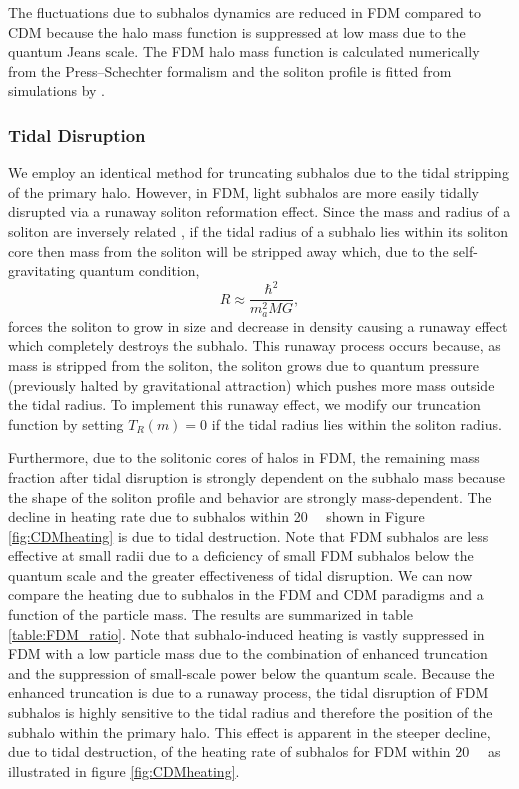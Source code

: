 \documentclass[usenatbib]{mnras}
\begin{document}
The fluctuations due to subhalos dynamics are reduced in FDM compared to CDM because the halo mass function is suppressed at low mass due to the quantum Jeans scale. The FDM halo mass function is calculated numerically from the Press--Schechter formalism \citep{substructure_FDM, marsh} and the soliton profile is fitted from simulations by \cite{schive_solitons}. 



\subsubsection{Tidal Disruption}

 
We employ an identical method for truncating subhalos due to the tidal stripping of the primary halo. However, in FDM, light subhalos are more easily tidally disrupted via a runaway soliton reformation effect. Since the mass and radius of a soliton are inversely related \citep{solitons}, if the tidal radius of a subhalo lies within its soliton core then mass from the soliton will be stripped away which, due to the self-gravitating quantum condition,
\begin{equation}
R \approx \frac{\hbar^2}{m_a^2 M G},
\end{equation} 
forces the soliton to grow in size and decrease in density causing a runaway effect which completely destroys the subhalo. This runaway process occurs because, as mass is stripped from the soliton, the soliton grows due to quantum pressure (previously halted by gravitational attraction) which pushes more mass outside the tidal radius. To implement this runaway effect, we modify our truncation function by setting $T_R(m) = 0$ if the tidal radius lies within the soliton radius. 

	Furthermore, due to the solitonic cores of halos in FDM, the remaining mass fraction after tidal disruption is strongly dependent on the subhalo mass because the shape of the soliton profile and behavior are strongly mass-dependent. The decline in heating rate due to subhalos within \SI{20}{\kilo\parsec} shown in Figure \ref{fig:CDMheating} is due to tidal destruction. Note that FDM subhalos are less effective at small radii due to a deficiency of small FDM subhalos below the quantum scale and the greater effectiveness of tidal disruption. We can now compare the heating due to subhalos in the FDM and CDM paradigms and a function of the particle mass. The results are summarized in table \ref{table:FDM_ratio}. Note that subhalo-induced heating is vastly suppressed in FDM with a low particle mass due to the combination of enhanced truncation and the suppression of small-scale power below the quantum scale. Because the enhanced truncation is due to a runaway process, the tidal disruption of FDM subhalos is highly sensitive to the tidal radius and therefore the position of the subhalo within the primary halo.
This effect is apparent in the steeper decline,  due to tidal destruction, of the heating rate of subhalos for FDM within \SI{20}{\kilo\parsec} as illustrated in figure \ref{fig:CDMheating}.
 
\end{document}
